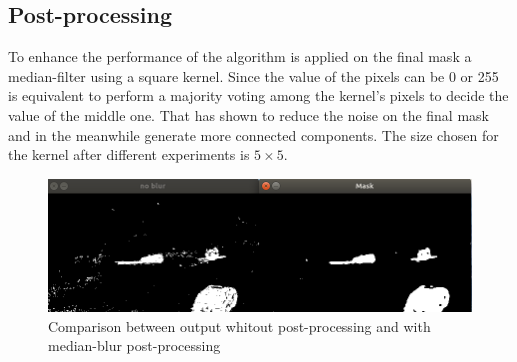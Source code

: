 \subsection{Post-processing}
To enhance the performance of the algorithm is applied on the final mask a median-filter using a square kernel. Since the value of the pixels can be 0 or 255 is equivalent to perform a majority voting among the kernel's pixels to decide the value of the middle one. That has shown to reduce the noise on the final mask and in the meanwhile generate more connected components. The size chosen for the kernel after different experiments is $5\times 5$.

\begin{figure}
\includegraphics[width=\linewidth]{Figures/median_blur.png}
\caption{Comparison between output whitout post-processing 			and with median-blur post-processing}
\end{figure}


